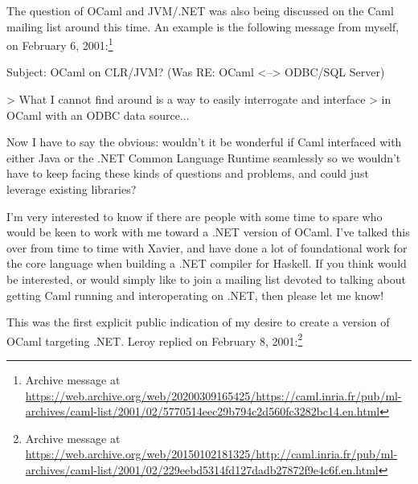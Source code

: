 \documentclass[acmsmall]{acmart}\settopmatter{}
\begin{document}
The question of OCaml and JVM/.NET was also being discussed on the Caml mailing list around this time.  An example is the following message from
myself, on February 6, 2001:\footnote{Archive message at \url{https://web.archive.org/web/20200309165425/https://caml.inria.fr/pub/ml-archives/caml-list/2001/02/5770514eec29b794c2d560fc3282bc14.en.html}}
\begin{verbquote}
Subject: OCaml on CLR/JVM? (Was RE: OCaml <--> ODBC/SQL Server)

> What I cannot find around is a way to easily interrogate and interface 
> in OCaml with an ODBC data source...

Now I have to say the obvious: wouldn't it be wonderful if Caml interfaced with either Java or the .NET Common Language Runtime seamlessly so we wouldn't have to keep facing these kinds of questions and problems, and could just leverage existing libraries?   

I'm very interested to know if there are people with some time to spare who would be keen to work with me toward a .NET version of OCaml.  I've talked this over from time to time with Xavier, and have done a lot of foundational work for the core language when building a .NET compiler for Haskell.  If you think would be interested, or would simply like to join a mailing list devoted to talking about getting Caml running and interoperating on .NET, then please let me know!
\end{verbquote}
This was the first explicit public indication of my desire to create a version of OCaml targeting .NET. Leroy replied on February 8, 2001:\footnote{Archive message at \url{https://web.archive.org/web/20150102181325/http://caml.inria.fr/pub/ml-archives/caml-list/2001/02/229eebd5314fd127dadb27872f9e4c6f.en.html}}
\end{document}

